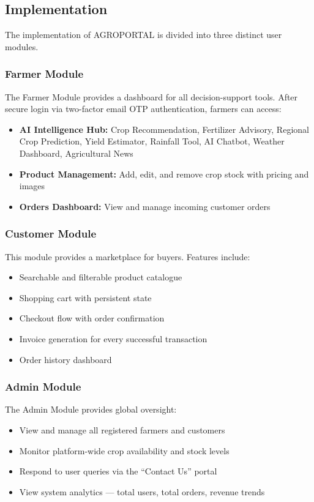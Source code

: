 \subsection{Implementation}

The implementation of AGROPORTAL is divided into three distinct user modules.

\subsubsection{Farmer Module}

The Farmer Module provides a dashboard for all decision-support tools. After secure login via two-factor email OTP authentication, farmers can access:
\begin{itemize}
    \item \textbf{AI Intelligence Hub:} Crop Recommendation, Fertilizer Advisory, Regional Crop Prediction, Yield Estimator, Rainfall Tool, AI Chatbot, Weather Dashboard, Agricultural News
    \item \textbf{Product Management:} Add, edit, and remove crop stock with pricing and images
    \item \textbf{Orders Dashboard:} View and manage incoming customer orders
\end{itemize}

\subsubsection{Customer Module}

This module provides a marketplace for buyers. Features include:
\begin{itemize}
    \item Searchable and filterable product catalogue
    \item Shopping cart with persistent state
    \item Checkout flow with order confirmation
    \item Invoice generation for every successful transaction
    \item Order history dashboard
\end{itemize}

\subsubsection{Admin Module}

The Admin Module provides global oversight:
\begin{itemize}
    \item View and manage all registered farmers and customers
    \item Monitor platform-wide crop availability and stock levels
    \item Respond to user queries via the ``Contact Us'' portal
    \item View system analytics --- total users, total orders, revenue trends
\end{itemize}

